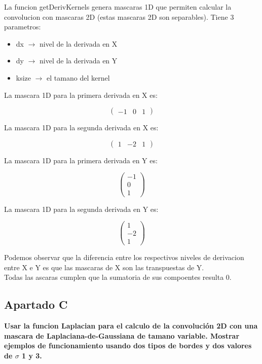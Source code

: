 \documentclass{article}
\begin{document}
La funcion getDerivKernels genera mascaras 1D que permiten calcular la convolucion con mascaras 2D (estas mascaras 2D son separables). Tiene 3 parametros:
\begin{itemize}
\item dx $\rightarrow$ nivel de la derivada en X 
\item dy $\rightarrow$ nivel de la derivada en Y
\item ksize $\rightarrow$ el tamano del kernel
\end{itemize}

La mascara 1D para la primera derivada en X es:
\begin{center}
$$
\begin{pmatrix}
-1 & 0 & 1
\end{pmatrix}
$$
\end{center}

La mascara 1D para la segunda derivada en X es:
\begin{center}
$$
\begin{pmatrix}
1 & -2 & 1
\end{pmatrix}
$$
\end{center}

La mascara 1D para la primera derivada en Y es:
\begin{center}
$$
\begin{pmatrix}
-1 \\
0 \\
1
\end{pmatrix}
$$
\end{center}

La mascara 1D para la segunda derivada en Y es:
\begin{center}
$$
\begin{pmatrix}
1  \\
-2 \\
1
\end{pmatrix}
$$
\end{center}

Podemos observar que la diferencia entre los respectivos niveles de derivacion entre X e Y es que las mascaras de X son las transpuestas de Y.
\\

Todas las ascaras cumplen que la sumatoria de sus compoentes resulta 0.



\subsection*{Apartado C}
\textbf{Usar la funcion Laplacian para el calculo de la convolución 2D con una mascara de Laplaciana-de-Gaussiana de tamano variable. Mostrar ejemplos de funcionamiento usando dos tipos de bordes y dos valores de $\sigma$ 1 y 3.}
\end{document}
